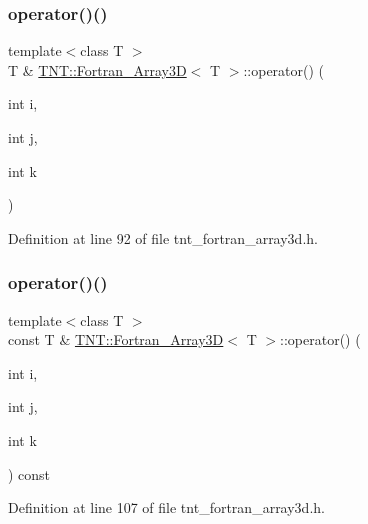 \subsubsection{\texorpdfstring{operator()()}{operator()()}\hspace{0.1cm}{\footnotesize\ttfamily [1/2]}}
{\footnotesize\ttfamily template$<$class T $>$ \\
T \& \hyperlink{classTNT_1_1Fortran__Array3D}{T\+N\+T\+::\+Fortran\+\_\+\+Array3D}$<$ T $>$\+::operator() (\begin{DoxyParamCaption}\item[{int}]{i,  }\item[{int}]{j,  }\item[{int}]{k }\end{DoxyParamCaption})\hspace{0.3cm}{\ttfamily [inline]}}



Definition at line 92 of file tnt\+\_\+fortran\+\_\+array3d.\+h.

\mbox{\label{classTNT_1_1Fortran__Array3D_acd0ca0c6c51e43e14645abf3aba027c4}} 
\subsubsection{\texorpdfstring{operator()()}{operator()()}\hspace{0.1cm}{\footnotesize\ttfamily [2/2]}}
{\footnotesize\ttfamily template$<$class T $>$ \\
const T \& \hyperlink{classTNT_1_1Fortran__Array3D}{T\+N\+T\+::\+Fortran\+\_\+\+Array3D}$<$ T $>$\+::operator() (\begin{DoxyParamCaption}\item[{int}]{i,  }\item[{int}]{j,  }\item[{int}]{k }\end{DoxyParamCaption}) const\hspace{0.3cm}{\ttfamily [inline]}}



Definition at line 107 of file tnt\+\_\+fortran\+\_\+array3d.\+h.

\mbox{\label{classTNT_1_1Fortran__Array3D_afb4adfeb473778f57769bca704245aa5}} 
